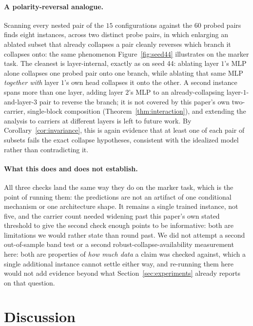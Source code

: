 \documentclass[11pt,a4paper]{article}
\begin{document}
\paragraph{A polarity-reversal analogue.} Scanning every nested pair of the
$15$ configurations against the $60$ probed pairs finds eight instances,
across two distinct probe pairs, in which enlarging an ablated subset that
already collapses a pair cleanly reverses which branch it collapses onto:
the same phenomenon Figure~\ref{fig:seed44} illustrates on the marker task.
The cleanest is layer-internal, exactly as on seed 44: ablating layer $1$'s
MLP alone collapses one probed pair onto one branch, while ablating that same
MLP \emph{together with} layer $1$'s own head collapses it onto the other.
A second instance spans more than one layer, adding layer $2$'s MLP to an
already-collapsing layer-$1$-and-layer-$3$ pair to reverse the branch; it is
not covered by this paper's own two-carrier, single-block composition
(Theorem~\ref{thm:interaction}), and extending the analysis to carriers at
different layers is left to future work. By Corollary~\ref{cor:invariance},
this is again evidence that at least one of each pair of subsets fails the
exact collapse hypotheses, consistent with the idealized model rather than
contradicting it.

\paragraph{What this does and does not establish.} All three checks land the
same way they do on the marker task, which is the point of running them: the
predictions are not an artifact of one conditional mechanism or one
architecture shape. It remains a single trained instance, not five, and the
carrier count needed widening past this paper's own stated threshold to give
the second check enough points to be informative: both are limitations we
would rather state than round past. We did not attempt a second
out-of-sample band test or a second robust-collapse-availability measurement
here: both are properties of \emph{how much data} a claim was checked
against, which a single additional instance cannot settle either way, and
re-running them here would not add evidence beyond what Section~\ref{sec:experiments}
already reports on that question.

\section{Discussion}
\label{sec:discussion}
\end{document}
